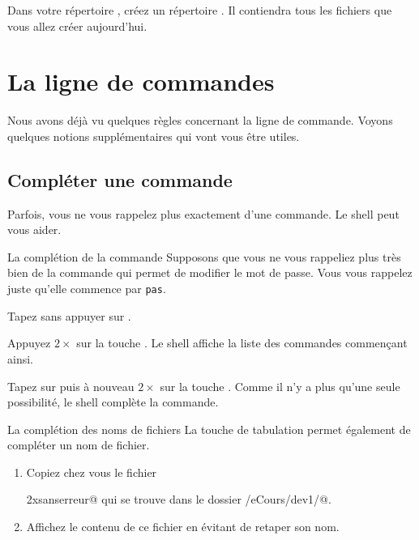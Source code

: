 \documentclass[a4paper,11pt]{style-esi/td}
\begin{document}
\entete
\titre
{}
\lastedit

\bigskip
\tableofcontents

\vfill
\begin{infobox}
    Dans votre répertoire , 
	créez un répertoire . 
    Il contiendra tous les fichiers que vous allez créer aujourd'hui. 
\end{infobox}
\vfill

\newpage

\section{La ligne de commandes}

	Nous avons déjà vu quelques règles concernant la ligne de commande.
	Voyons quelques notions supplémentaires qui vont vous être utiles.

	\subsection{Compléter une commande}

		Parfois, vous ne vous rappelez plus exactement d'une commande.
		Le shell peut vous aider.  

		\begin{Experience}{La complétion de la commande} 
			Supposons que vous ne vous rappeliez plus très bien 
			de la commande qui permet de modifier le mot de passe.
			Vous vous rappelez juste qu'elle commence par \verb|pas|.
			\begin{steps}
			\item 
				Tapez  sans appuyer sur .
			\item 
				Appuyez $2\times$ sur la touche .
				Le shell affiche la liste des commandes commençant ainsi.
			\item 
				Tapez sur  puis à nouveau $2\times$ sur la touche .
				Comme il n'y a plus qu'une seule possibilité, le shell complète la commande.
			\end{steps}  
		\end{Experience}		

		\begin{Exercice}{La complétion des noms de fichiers} 
			La touche de tabulation permet également de compléter un nom de fichier. 
			\begin{enumerate}
  			\item Copiez chez vous le fichier\par
	  			\verb@monfichieraunomtellementlongquilmeparaitpeuprobabledeletaper2xsanserreur@ 
	  			qui se trouve dans le dossier \verb@/eCours/dev1/@.
			\item Affichez le contenu de ce fichier en évitant de retaper son nom.
			\end{enumerate}
		\end{Exercice}	
\end{document}
